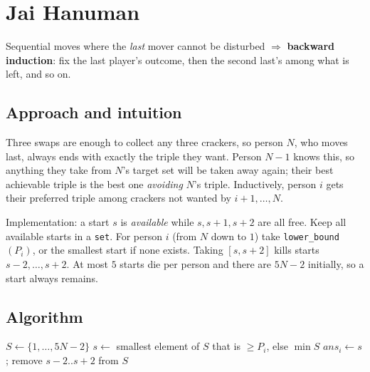 \section{Jai Hanuman}
\label{sec:g-jai-hanuman}


\begin{patternbox}
Sequential moves where the \emph{last} mover cannot be disturbed
$\Rightarrow$ \textbf{backward induction}: fix the last player's outcome,
then the second last's among what is left, and so on.
\end{patternbox}

\subsection*{Approach and intuition}

Three swaps are enough to collect any three crackers, so person $N$, who moves
last, always ends with exactly the triple they want. Person $N-1$ knows this,
so anything they take from $N$'s target set will be taken away again; their
best achievable triple is the best one \emph{avoiding} $N$'s triple. Inductively,
person $i$ gets their preferred triple among crackers not wanted by
$i+1,\dots,N$.

Implementation: a start $s$ is \emph{available} while $s,s+1,s+2$ are all
free. Keep all available starts in a \texttt{set}. For person $i$ (from $N$
down to $1$) take \texttt{lower\_bound}$(P_i)$, or the smallest start if none
exists. Taking $[s,s+2]$ kills starts $s-2,\dots,s+2$. At most $5$ starts die
per person and there are $5N-2$ initially, so a start always remains.

\subsection*{Algorithm}
\begin{algorithmic}[1]
\State $S\gets\{1,\dots,5N-2\}$
  \State $s\gets$ smallest element of $S$ that is $\ge P_i$, else $\min S$
  \State $ans_i\gets s$; remove $s-2..s+2$ from $S$
\EndFor
\end{algorithmic}

